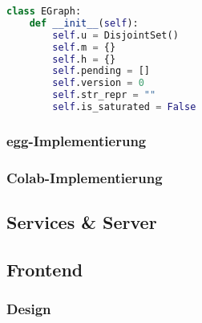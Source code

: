 \begin{lstlisting}[language=Python, caption=Klasse \textit{EGraph}]
class EGraph:
    def __init__(self):
        self.u = DisjointSet()
        self.m = {}
        self.h = {}
        self.pending = []
        self.version = 0
        self.str_repr = ""
        self.is_saturated = False
\end{lstlisting}

\subsubsection{egg-Implementierung}

\subsubsection{Colab-Implementierung}

\subsection{Services \& Server}

\subsection{Frontend}

\subsubsection{Design}
